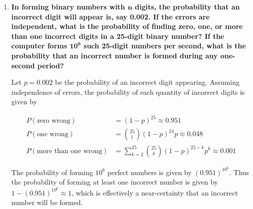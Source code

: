 \documentclass[10pt, oneside]{article}
\begin{document}
\begin{enumerate}[label=8.\arabic*]
\begin{enumerate}
	Allowing us to conclude
	
	\[ P(\text{machine does not fail for 20 hours}) = \Bigg( \sum^1_{k=0} \frac{e^{-0.1} (0.1)^k}{k!} \Bigg)^2 \approx \boxed{0.910} \]
	
	\end{enumerate}

\item  \begin{tcolorbox}[
  colback=Cerulean!5!white,
  colframe=Cerulean!75!black]
\textbf{In forming binary numbers with $\bm{n}$ digits, the probability that an incorrect digit will appear is, say 0.002. If the errors are independent, what is the probability of finding zero, one, or more than one incorrect digits in a 25-digit binary number? If the computer forms $\bm{10^6}$ such 25-digit numbers per second, what is the probability that an incorrect number is formed during any one-second period?}
\end{tcolorbox}

Let $p = 0.002$ be the probability of an incorrect digit appearing. Assuming independence of errors, the probability of each quantity of incorrect digits is given by

\begin{align*}
P(\text{zero wrong}) &= (1-p)^{25} \approx \boxed{0.951} \\
P(\text{one wrong}) &= \binom{25}{1} (1-p)^{24} p \approx \boxed{0.048} \\
P(\text{more than one wrong}) &= \sum^{25}_{k=2} \binom{25}{k} (1-p)^{25-k} p^k \approx \boxed{0.001}
\end{align*}

The probability of forming $10^6$ perfect numbers is given by $(0.951)^{10^6}$. Thus the probability of forming at least one incorrect number is given by $\boxed{1 - (0.951)^{10^6} \approx 1}$, which is effectively a near-certainty that an incorrect number will be formed.


\end{enumerate}
\end{document}
